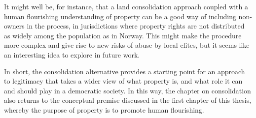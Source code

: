 It might well be, for instance, that a land consolidation approach coupled with a human flourishing understanding of property can be a good way of including non-owners in the process, in jurisdictions where property rights are not distributed as widely among the population as in Norway. This might make the procedure more complex and give rise to new risks of abuse by local elites, but it seems like an interesting idea to explore in future work. 

In short, the consolidation alternative provides a starting point for an approach to legitimacy that takes a wider view of what property is, and what role it can and should play in a democratic society. In this way, the chapter on consolidation also returns to the conceptual premise discussed in the first chapter of this thesis, whereby the purpose of property is to promote human flourishing.


